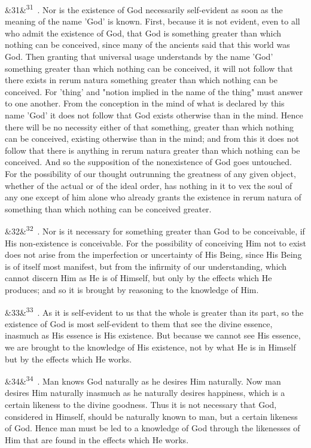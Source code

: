 \documentclass[12pt]{article}
\newcommand{\para}[1][]{\par\noindent\ifx&#1&\else\textsuperscript{\footnotesize #1}~\fi}
\begin{document}
\para[31] 1. Nor is the existence of God necessarily self-evident as soon as the meaning of the name 'God' is known. First, because it is not evident, even to all who admit the existence of God, that God is something greater than which nothing can be conceived, since many of the ancients said that this world was God. Then granting that universal usage understands by the name 'God' something greater than which nothing can be conceived, it will not follow that there exists in rerum natura something greater than which nothing can be conceived. For 'thing' and "notion implied in the name of the thing" must answer to one another. From the conception in the mind of what is declared by this name 'God' it does not follow that God exists otherwise than in the mind. Hence there will be no necessity either of that something, greater than which nothing can be conceived, existing otherwise than in the mind; and from this it does not follow that there is anything in rerum natura greater than which nothing can be conceived. And so the supposition of the nonexistence of God goes untouched. For the possibility of our thought outrunning the greatness of any given object, whether of the actual or of the ideal order, has nothing in it to vex the soul of any one except of him alone who already grants the existence in rerum natura of something than which nothing can be conceived greater.

\para[32] 2. Nor is it necessary for something greater than God to be conceivable, if His non-existence is conceivable. For the possibility of conceiving Him not to exist does not arise from the imperfection or uncertainty of His Being, since His Being is of itself most manifest, but from the infirmity of our understanding, which cannot discern Him as He is of Himself, but only by the effects which He produces; and so it is brought by reasoning to the knowledge of Him.

\para[33] 3. As it is self-evident to us that the whole is greater than its part, so the existence of God is most self-evident to them that see the divine essence, inasmuch as His essence is His existence. But because we cannot see His essence, we are brought to the knowledge of His existence, not by what He is in Himself but by the effects which He works.

\para[34] 4. Man knows God naturally as he desires Him naturally. Now man desires Him naturally inasmuch as he naturally desires happiness, which is a certain likeness to the divine goodness. Thus it is not necessary that God, considered in Himself, should be naturally known to man, but a certain likeness of God. Hence man must be led to a knowledge of God through the likenesses of Him that are found in the effects which He works.
\end{document}

